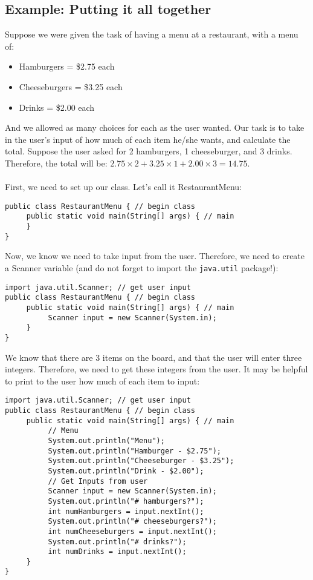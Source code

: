 \subsection{Example: Putting it all together}
Suppose we were given the task of having a menu at a restaurant, with a menu of: 
\begin{itemize}
\item Hamburgers = \$2.75 each
\item Cheeseburgers = \$3.25 each
\item Drinks = \$2.00 each
\end{itemize}
And we allowed as many choices for each as the user wanted. Our task is to take in the user's input of how much of each item he/she wants, and calculate the total. Suppose the user asked for 2 hamburgers, 1 cheeseburger, and 3 drinks. Therefore, the total will be: $2.75 \times 2 + 3.25 \times 1 + 2.00 \times 3 = 14.75$.
\\ \\
First, we need to set up our class. Let's call it RestaurantMenu:
\begin{lstlisting}
public class RestaurantMenu { // begin class
     public static void main(String[] args) { // main
     }
}
\end{lstlisting}

Now, we know we need to take input from the user. Therefore, we need to create a Scanner variable (and do not forget to import the \verb|java.util| package!):

\begin{lstlisting}
import java.util.Scanner; // get user input
public class RestaurantMenu { // begin class
     public static void main(String[] args) { // main
          Scanner input = new Scanner(System.in);
     }
}
\end{lstlisting}

\noindent We know that there are 3 items on the board, and that the user will enter three integers. Therefore, we need to get these integers from the user. It may be helpful to print to the user how much of each item to input: 

\begin{lstlisting}
import java.util.Scanner; // get user input
public class RestaurantMenu { // begin class
     public static void main(String[] args) { // main
          // Menu
          System.out.println("Menu");
          System.out.println("Hamburger - $2.75");
          System.out.println("Cheeseburger - $3.25");
          System.out.println("Drink - $2.00");
          // Get Inputs from user
          Scanner input = new Scanner(System.in);
          System.out.println("# hamburgers?");
          int numHamburgers = input.nextInt();
          System.out.println("# cheeseburgers?");
          int numCheeseburgers = input.nextInt();
          System.out.println("# drinks?");
          int numDrinks = input.nextInt();
     }
}
\end{lstlisting}

